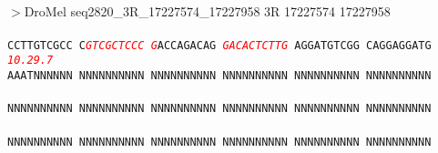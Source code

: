 \documentclass[11pt,twoside,reqno,a4paper]{article}
\begin{document}
\\
$>$DroMel	seq2820\_3R\_17227574\_17227958	3R	17227574	17227958 \\
 \\
\texttt{CCTTGTCGCC	C\textit{\textcolor{Red}{G}}\textit{\textcolor{Red}{T}}\textit{\textcolor{Red}{C}}\textit{\textcolor{Red}{G}}\textit{\textcolor{Red}{C}}\textit{\textcolor{Red}{T}}\textit{\textcolor{Red}{C}}\textit{\textcolor{Red}{C}}\textit{\textcolor{Red}{C}}	\textit{\textcolor{Red}{G}}ACCAGACAG	\textit{\textcolor{Red}{G}}\textit{\textcolor{Red}{A}}\textit{\textcolor{Red}{C}}\textit{\textcolor{Red}{A}}\textit{\textcolor{Red}{C}}\textit{\textcolor{Red}{T}}\textit{\textcolor{Red}{C}}\textit{\textcolor{Red}{T}}\textit{\textcolor{Red}{T}}\textit{\textcolor{Red}{G}}	AGGATGTCGG	CAGGAGGATG	\\
\hspace*{1\charwidth}\hspace*{11\charwidth}\textit{\textcolor{Red}{10.2}}\hspace*{1\charwidth}\hspace*{1\charwidth}\hspace*{1\charwidth}\hspace*{-3\charwidth}\textit{\textcolor{Red}{9.7}}\hspace*{1\charwidth}\hspace*{1\charwidth}\hspace*{1\charwidth}\\
AAATNNNNNN	NNNNNNNNNN	NNNNNNNNNN	NNNNNNNNNN	NNNNNNNNNN	NNNNNNNNNN	\\
\hspace*{1\charwidth}\hspace*{1\charwidth}\hspace*{1\charwidth}\hspace*{1\charwidth}\hspace*{1\charwidth}\hspace*{1\charwidth}\\
NNNNNNNNNN	NNNNNNNNNN	NNNNNNNNNN	NNNNNNNNNN	NNNNNNNNNN	NNNNNNNNNN	\\
\hspace*{1\charwidth}\hspace*{1\charwidth}\hspace*{1\charwidth}\hspace*{1\charwidth}\hspace*{1\charwidth}\hspace*{1\charwidth}\\
NNNNNNNNNN	NNNNNNNNNN	NNNNNNNNNN	NNNNNNNNNN	NNNNNNNNNN	NNNNNNNNNN	\\
}
\end{document}
